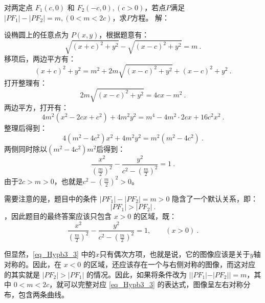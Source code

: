 \begin{example}{对两定点 $F_1(c, 0)$ 和 $F_2(-c, 0),(c>0)$，若点$P$满足$|PF_1| - |PF_2| = m,(0<m <2c)$，求$P$方程。}
解：

设椭圆上的任意点为 $P(x, y)$，根据题意有：
\begin{equation}
\sqrt{(x + c)^2 + y^2} - \sqrt{(x - c)^2 + y^2} = m~.
\end{equation}
移项后，两边平方有：
\begin{equation}
(x + c)^2 + y^2 = m^2 + 2m\sqrt{(x - c)^2 + y^2} + (x - c)^2 + y^2~.
\end{equation}
打开整理有：
\begin{equation}
2m\sqrt{(x - c)^2 + y^2}= 4cx - m^2~.
\end{equation}
两边平方，打开有：
\begin{equation}\label{eq_Hypb3_6}
4m^2(x^2 - 2cx+c^2) + 4m^2y^2= m^4-4m^2\cdot2cx+16c^2x^2~.
\end{equation}
整理后得到：
\begin{equation}
4(m^2 -4c^2)x^2 + 4m^2y^2= m^2(m^2-4c^2)~.
\end{equation}
两侧同时除以$(m^2-4c^2)m^2$后得到：
\begin{equation}\label{eq_Hypb3_3}
\frac{x^2}{\left(\displaystyle\frac{m}{2}\right)^2} -\frac{y^2}{\displaystyle c^2-\left(\frac{m}{2}\right)^2}=1~.
\end{equation}
由于$2c>m>0$，也就是$\displaystyle c^2-\left(\frac{m}{2}\right)^2>0$。

需要注意的是，题目中的条件 $|PF_1| - |PF_2| = m > 0$ 隐含了一个默认关系，即：
\begin{equation}
|PF_1| > |PF_2|~.
\end{equation}
，因此题目的最终答案应该只包含 $x > 0$ 的区域，既：
\begin{equation}
\frac{x^2}{\left(\displaystyle\frac{m}{2}\right)^2} -\frac{y^2}{\displaystyle c^2-\left(\frac{m}{2}\right)^2}=1,\qquad(x>0)~.
\end{equation}

但显然，\autoref{eq_Hypb3_3} 中的$x$只有偶次方项，也就是说，它的图像应该是关于$y$轴对称的。因此，在 $x< 0$ 的区域，还应该存在一个与右侧对称的图像，而这对应的其实就是 $|PF_2| > |PF_1|$ 的情况。因此，如果将条件改为 $||PF_1| - |PF_2|| = m$，其中 $0 < m < 2c$，就可以完整对应 \autoref{eq_Hypb3_3} 的表达式，图像呈左右对称分布，包含两条曲线。
\end{example}

